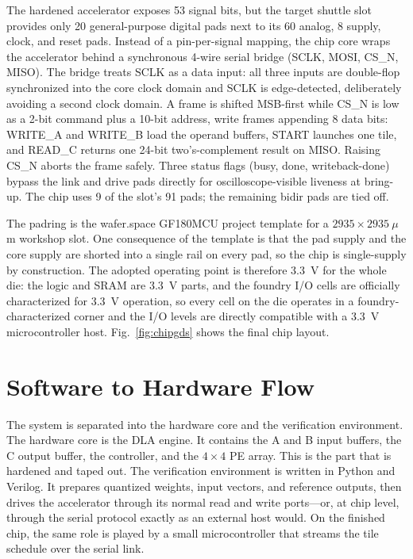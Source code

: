 \documentclass[conference,a4paper]{APSIPA2026}
\begin{document}
The hardened accelerator exposes 53 signal bits, but the target shuttle slot provides only 20 general-purpose digital pads next to its 60 analog, 8 supply, clock, and reset pads. Instead of a pin-per-signal mapping, the chip core wraps the accelerator behind a synchronous 4-wire serial bridge (SCLK, MOSI, CS\_N, MISO). The bridge treats SCLK as a data input: all three inputs are double-flop synchronized into the core clock domain and SCLK is edge-detected, deliberately avoiding a second clock domain. A frame is shifted MSB-first while CS\_N is low as a 2-bit command plus a 10-bit address, write frames appending 8 data bits: WRITE\_A and WRITE\_B load the operand buffers, START launches one tile, and READ\_C returns one 24-bit two's-complement result on MISO. Raising CS\_N aborts the frame safely. Three status flags (busy, done, writeback-done) bypass the link and drive pads directly for oscilloscope-visible liveness at bring-up. The chip uses 9 of the slot's 91 pads; the remaining bidir pads are tied off.

The padring is the wafer.space GF180MCU project template \cite{padring} for a $2935\times2935~\mu$m workshop slot. One consequence of the template is that the pad supply and the core supply are shorted into a single rail on every pad, so the chip is single-supply by construction. The adopted operating point is therefore 3.3~V for the whole die: the logic and SRAM are 3.3~V parts, and the foundry I/O cells are officially characterized for 3.3~V operation, so every cell on the die operates in a foundry-characterized corner and the I/O levels are directly compatible with a 3.3~V microcontroller host. Fig.~\ref{fig:chipgds} shows the final chip layout.

\section{Software to Hardware Flow}\label{sec:sw}

The system is separated into the hardware core and the verification environment. The hardware core is the DLA engine. It contains the A and B input buffers, the C output buffer, the controller, and the $4\times4$ PE array. This is the part that is hardened and taped out. The verification environment is written in Python and Verilog. It prepares quantized weights, input vectors, and reference outputs, then drives the accelerator through its normal read and write ports---or, at chip level, through the serial protocol exactly as an external host would. On the finished chip, the same role is played by a small microcontroller that streams the tile schedule over the serial link.
\end{document}
